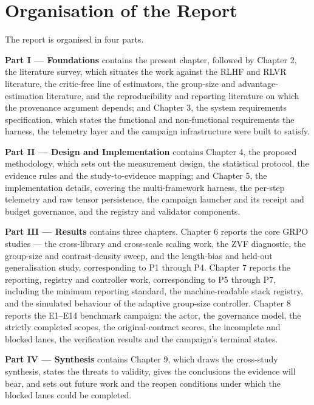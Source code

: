 \documentclass[12pt,a4paper]{report}
\begin{document}
\section{Organisation of the Report}\label{organisation-of-the-report}

The report is organised in four parts.

\textbf{Part I --- Foundations} contains the present chapter, followed
by Chapter 2, the literature survey, which situates the work against the
RLHF and RLVR literature, the critic-free line of estimators, the
group-size and advantage-estimation literature, and the reproducibility
and reporting literature on which the provenance argument depends; and
Chapter 3, the system requirements specification, which states the
functional and non-functional requirements the harness, the telemetry
layer and the campaign infrastructure were built to satisfy.

\textbf{Part II --- Design and Implementation} contains Chapter 4, the
proposed methodology, which sets out the measurement design, the
statistical protocol, the evidence rules and the study-to-evidence
mapping; and Chapter 5, the implementation details, covering the
multi-framework harness, the per-step telemetry and raw tensor
persistence, the campaign launcher and its receipt and budget
governance, and the registry and validator components.

\textbf{Part III --- Results} contains three chapters. Chapter 6 reports
the core GRPO studies --- the cross-library and cross-scale scaling
work, the ZVF diagnostic, the group-size and contrast-density sweep, and
the length-bias and held-out generalisation study, corresponding to P1
through P4. Chapter 7 reports the reporting, registry and controller
work, corresponding to P5 through P7, including the minimum reporting
standard, the machine-readable stack registry, and the simulated
behaviour of the adaptive group-size controller. Chapter 8 reports the
E1--E14 benchmark campaign: the actor, the governance model, the
strictly completed scopes, the original-contract scores, the incomplete
and blocked lanes, the verification results and the campaign's terminal
states.

\textbf{Part IV --- Synthesis} contains Chapter 9, which draws the
cross-study synthesis, states the threats to validity, gives the
conclusions the evidence will bear, and sets out future work and the
reopen conditions under which the blocked lanes could be completed.
\end{document}
